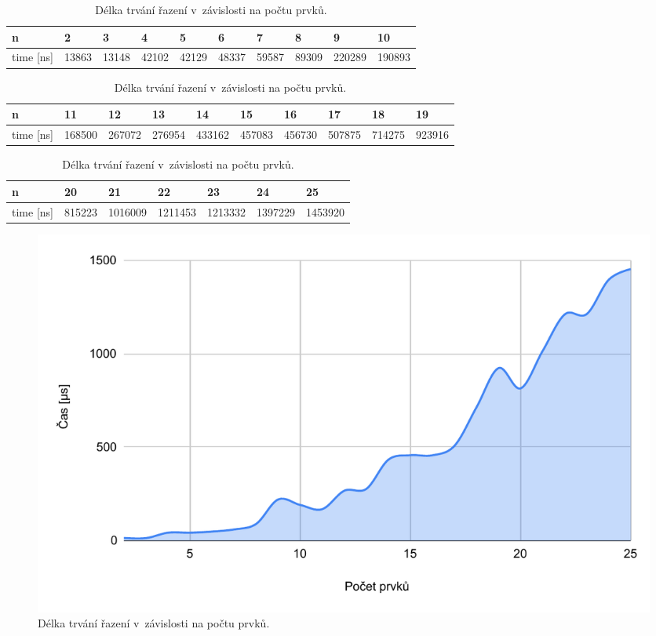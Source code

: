 \documentclass[11pt, a4paper, titlepage]{article}
\begin{document}
\begin{table}[H]

    \begin{tabular}{|l|p{1.25cm}p{1.25cm}p{1.25cm}p{1.25cm}p{1.25cm}p{1.25cm}p{1.25cm}p{1.25cm}p{1.25cm}|}
        \hline
        n             & 2     & 3     & 4     & 5     & 6     & 7     & 8     & 9      & 10     \\ \hline
        time {[}ns{]} & 13863 & 13148 & 42102 & 42129 & 48337 & 59587 & 89309 & 220289 & 190893 \\ \hline
    \end{tabular}
    \medskip

    \begin{tabular}{|l|p{1.25cm}p{1.25cm}p{1.25cm}p{1.25cm}p{1.25cm}p{1.25cm}p{1.25cm}p{1.25cm}p{1.25cm}|}
        \hline
        n             & 11     & 12     & 13     & 14     & 15     & 16     & 17     & 18     & 19     \\ \hline
        time {[}ns{]} & 168500 & 267072 & 276954 & 433162 & 457083 & 456730 & 507875 & 714275 & 923916 \\ \hline
    \end{tabular}
    \medskip

    \begin{tabular}{|l|p{1.25cm}p{1.25cm}p{1.25cm}p{1.25cm}p{1.25cm}p{1.25cm}|}
        \hline
        n             & 20     & 21      & 22      & 23      & 24      & 25      \\ \hline
        time {[}ns{]} & 815223 & 1016009 & 1211453 & 1213332 & 1397229 & 1453920 \\ \hline
    \end{tabular}
    \caption{Délka trvání řazení v~závislosti na počtu prvků.}
\end{table}

\begin{figure}[H]
    \centering
    \includegraphics[width=.8\textwidth]{chart.pdf}
    \caption{Délka trvání řazení v~závislosti na počtu prvků.}
\end{figure}
\end{document}

